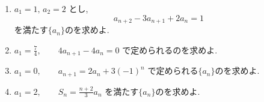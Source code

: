 \begin{enumerate}[label=\textbf{問\arabic*.},leftmargin=3.8em,format=\bookitemlink{practice-basic}{problem}{hint}]
    \[
      a_{n+1}=pa_n+q
    \]
    で定められる$\{a_n\}$について,
    \[
      a_1=8,\qquad a_2=5,\qquad a_3=\frac72
    \]
    であることが分かっている.$p,q$の値とを求めよ.
  \item $a_1=1,\,a_2=2$ とし,
    \[
      a_{n+2}-3a_{n+1}+2a_n=1
    \]
    を満たす$\{a_n\}$のを求めよ.
  \item $a_1=\frac74,\qquad 4a_{n+1}-4a_n=0$
    で定められるのを求めよ.
  \item $a_1=0,\qquad a_{n+1}=2a_n+3(-1)^n$
    で定められる$\{a_n\}$のを求めよ.
  \item $a_1=2,\qquad S_n=\frac{n+2}{3}a_n$
    を満たす$\{a_n\}$のを求めよ.
\end{enumerate}

